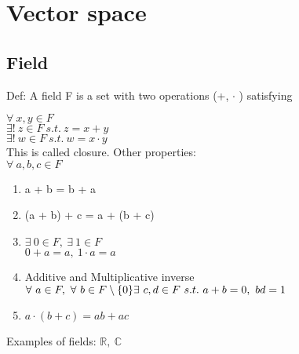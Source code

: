 \documentclass[a4paper]{article}
\begin{document}
\section{Vector space}
\subsection{Field}
Def: A field F is a set with two operations (+, $\cdot$ ) satisfying

\noindent $\forall\ x,y \in F$\\
\-\hspace{1in}$\exists !\ z \in F\ s.t.\ z = x + y$\\
\-\hspace{1in}$\exists !\ w \in F\ s.t.\ w = x \cdot y$\\ 
This is called closure.
\noindent Other properties:\\
$\forall\ a,b,c \in F$
\begin{enumerate}
	\item{a + b = b + a}
	\item{(a + b) + c = a + (b + c)}
	\item{$\exists \ 0 \in F,\ \exists \ 1 \in F$}\\
		$0 + a = a,\ 1 \cdot a = a$ 
	\item{Additive and Multiplicative inverse \\ $\forall \ a \in F,\ \forall \ b \in F \setminus \{0\} \\ \exists \ c,d \in F \ s.t. \ a + b = 0, \ bd = 1$}
	\item{$a \cdot (b + c) = ab + ac$}
\end{enumerate}

Examples of fields: $\mathbb{R},\ \mathbb{C}$
\end{document}
